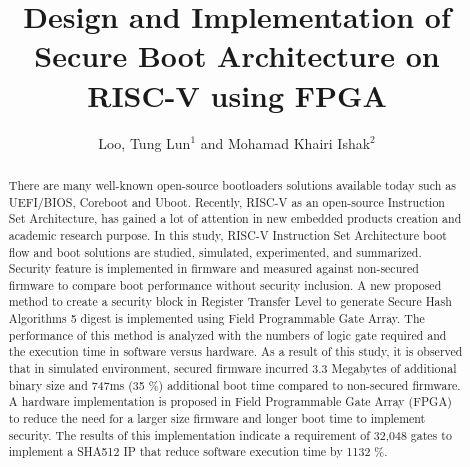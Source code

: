\documentclass[]{rsos}%
\begin{document}
\title{Design and Implementation of Secure Boot Architecture on RISC-V using FPGA}

\author{%
Loo, Tung Lun$^{1}$ and Mohamad Khairi Ishak$^{2}$}

\address{$^{1}$School of Electrical and Electronic Engineering, Universiti Sains Malaysia, 14300, Nibong Tebal, Pulau Pinang, Malaysia.\\
$^{2}$School of Electrical and Electronic Engineering, Universiti Sains Malaysia, 14300, Nibong Tebal, Pulau Pinang, Malaysia.\\}

\subject{riscv, security, firmware}



\begin{abstract}
There are many well-known open-source bootloaders solutions available today such as UEFI/BIOS, Coreboot and Uboot.
Recently, RISC-V as an open-source Instruction Set Architecture, has gained a lot of attention in new embedded products
creation and academic research purpose. In this study, RISC-V Instruction Set Architecture boot flow and
boot solutions are studied, simulated, experimented, and summarized. Security feature is implemented in firmware and
measured against non-secured firmware to compare boot performance without security inclusion. A new proposed method
to create a security block in Register Transfer Level to generate Secure Hash Algorithms 5 digest is implemented using Field
Programmable Gate Array. The performance of this method is analyzed with the numbers of logic gate required and the
execution time in software versus hardware. As a result of this study, it is observed that in simulated environment, secured
firmware incurred 3.3 Megabytes of additional binary size and 747ms (35 \%) additional boot time compared to non-secured
firmware. A hardware implementation is proposed in Field Programmable Gate Array (FPGA) to reduce the need for a larger
size firmware and longer boot time to implement security. The results of this implementation indicate a requirement of
32,048 gates to implement a SHA512 IP that reduce software execution time by 1132 \%.
\end{abstract}
\end{document}
